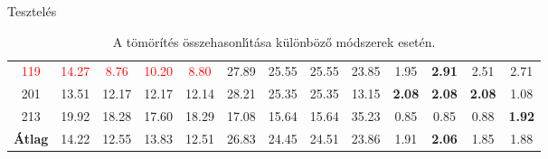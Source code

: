 \documentclass{beamer}
\begin{document}
\begin{frame}{Tesztelés}
{\begin{table}[H]
{\begin{tabular}{|c||cccc|cccc|cccc|}
\textcolor{red}{119} & \textcolor{red}{14.27} & \textcolor{red}{8.76} & \textcolor{red}{10.20}  &\textcolor{red}{8.80} & 27.89 & 25.55 & 25.55 & 23.85 &1.95&\textbf{2.91}&2.51& 2.71\\
201 & 13.51 & 12.17 & 12.17 &12.14& 28.21 & 25.35 & 25.35 & 13.15 &\textbf{2.08}&\textbf{2.08}&\textbf{2.08}& 1.08\\
213 & 19.92 & 18.28 & 17.60 &18.29& 17.08 & 15.64 & 15.64 & 35.23 &0.85&0.85&0.88& \textbf{1.92}\\
\hline
\textbf{\'Atlag} & 14.22 & 12.55 & 13.83 &12.51& 26.83 & 24.45 & 24.51 & 23.86 &1.91&\textbf{2.06}&1.85& 1.88\\\hline
\end{tabular}
}
\caption{A tömörítés \"osszehasonl\'\i t\'asa k\"ul\"onb\"oz\H o m\'odszerek eset\'en.}
\label{tab:results}
\end{table}
}
\end{frame}
\end{document}
